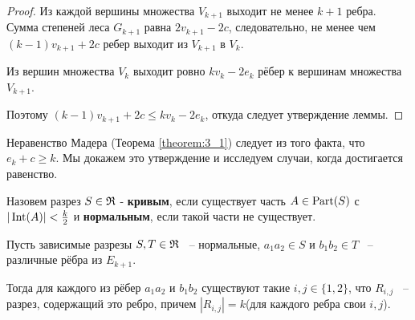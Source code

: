 \begin{proof}
	Из каждой вершины множества $V_{k + 1}$ выходит не менее  $k + 1$ ребра.
Сумма степеней леса  $G_{k + 1}$ равна  $2v_{k + 1} - 2c$, следовательно, не менее чем  $(k - 1) v_{k + 1} + 2c$ ребер выходит из $V_{k +1}$ в  $V_k$.

Из вершин множества $V_k$ выходит ровно  $k v_k - 2 e_k$ рёбер к вершинам множества  $V_{k + 1}$.

Поэтому  $(k - 1) v_{k + 1} + 2c \leqslant k v_k - 2 e_k$, откуда следует утверждение леммы.

\end{proof}

Неравенство Мадера (Теорема \ref{theorem:3_1}) следует из того факта, что $e_k + c \geqslant k$.
Мы докажем это утверждение и исследуем случаи, когда достигается равенство.

\begin{df*}
	Назовем разрез $S \in \mathfrak{R}$ - \textbf{кривым}, если существует часть  $A \in \operatorname{Part}(S)$ с  $|\operatorname{Int}(A)| < \frac k 2$ и  \textbf{нормальным}, если такой части не существует.
\end{df*}

\begin{customlm}{3.4} \label{lemma:3_4}
	Пусть зависимые разрезы $S, T \in \mathfrak{R}$ ~-- нормальные,  $a_1a_2 \in S$ и $b_1 b_2 \in T$ ~-- различные рёбра из $E_{k + 1}$.

	Тогда для каждого из рёбер  $a_1a_2$ и $b_1b_2$ существуют такие $i, j \in \{1, 2\}$, что  $R_{i, j}$ ~-- разрез, содержащий это ребро, причем  $|R_{i, j}| = k$(для каждого ребра свои $i, j$).
\end{customlm}

